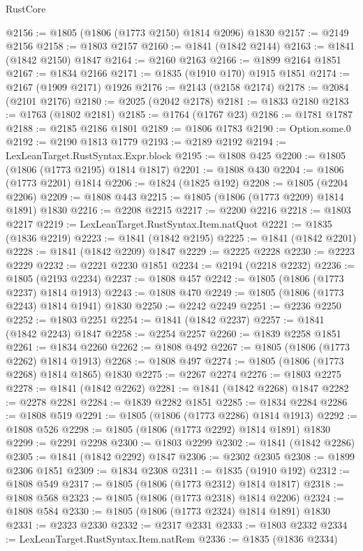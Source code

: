 \begin{lexlean}{RustCore}
\begin{coremodule}
@2156 := @1805 (@1806 (@1773 @2150) @1814 @2096) @1830
@2157 := @2149 @2156
@2158 := @1803 @2157
@2160 := @1841 (@1842 @2144)
@2163 := @1841 (@1842 @2150) @1847
@2164 := @2160 @2163
@2166 := @1899 @2164 @1851
@2167 := @1834 @2166
@2171 := @1835 (@1910 @170) @1915 @1851
@2174 := @2167 (@1909 @2171) @1926
@2176 := @2143 (@2158 @2174)
@2178 := @2084 (@2101 @2176)
@2180 := @2025 (@2042 @2178)
@2181 := @1833 @2180
@2183 := @1763 (@1802 @2181)
@2185 := @1764 (@1767 @23)
@2186 := @1781 @1787
@2188 := @2185 @2186 @1801
@2189 := @1806 @1783
@2190 := Option.some.{0}
@2192 := @2190 @1813 @1779
@2193 := @2189 @2192
@2194 := LexLeanTarget.RustSyntax.Expr.block
@2195 := @1808 @425
@2200 := @1805 (@1806 (@1773 @2195) @1814 @1817)
@2201 := @1808 @430
@2204 := @1806 (@1773 @2201) @1814
@2206 := @1824 (@1825 @192)
@2208 := @1805 (@2204 @2206)
@2209 := @1808 @443
@2215 := @1805 (@1806 (@1773 @2209) @1814 @1891) @1830
@2216 := @2208 @2215
@2217 := @2200 @2216
@2218 := @1803 @2217
@2219 := LexLeanTarget.RustSyntax.Item.natQuot
@2221 := @1835 (@1836 @2219)
@2223 := @1841 (@1842 @2195)
@2225 := @1841 (@1842 @2201)
@2228 := @1841 (@1842 @2209) @1847
@2229 := @2225 @2228
@2230 := @2223 @2229
@2232 := @2221 @2230 @1851
@2234 := @2194 (@2218 @2232)
@2236 := @1805 (@2193 @2234)
@2237 := @1808 @457
@2242 := @1805 (@1806 (@1773 @2237) @1814 @1913)
@2243 := @1808 @470
@2249 := @1805 (@1806 (@1773 @2243) @1814 @1941) @1830
@2250 := @2242 @2249
@2251 := @2236 @2250
@2252 := @1803 @2251
@2254 := @1841 (@1842 @2237)
@2257 := @1841 (@1842 @2243) @1847
@2258 := @2254 @2257
@2260 := @1839 @2258 @1851
@2261 := @1834 @2260
@2262 := @1808 @492
@2267 := @1805 (@1806 (@1773 @2262) @1814 @1913)
@2268 := @1808 @497
@2274 := @1805 (@1806 (@1773 @2268) @1814 @1865) @1830
@2275 := @2267 @2274
@2276 := @1803 @2275
@2278 := @1841 (@1842 @2262)
@2281 := @1841 (@1842 @2268) @1847
@2282 := @2278 @2281
@2284 := @1839 @2282 @1851
@2285 := @1834 @2284
@2286 := @1808 @519
@2291 := @1805 (@1806 (@1773 @2286) @1814 @1913)
@2292 := @1808 @526
@2298 := @1805 (@1806 (@1773 @2292) @1814 @1891) @1830
@2299 := @2291 @2298
@2300 := @1803 @2299
@2302 := @1841 (@1842 @2286)
@2305 := @1841 (@1842 @2292) @1847
@2306 := @2302 @2305
@2308 := @1899 @2306 @1851
@2309 := @1834 @2308
@2311 := @1835 (@1910 @192)
@2312 := @1808 @549
@2317 := @1805 (@1806 (@1773 @2312) @1814 @1817)
@2318 := @1808 @568
@2323 := @1805 (@1806 (@1773 @2318) @1814 @2206)
@2324 := @1808 @584
@2330 := @1805 (@1806 (@1773 @2324) @1814 @1891) @1830
@2331 := @2323 @2330
@2332 := @2317 @2331
@2333 := @1803 @2332
@2334 := LexLeanTarget.RustSyntax.Item.natRem
@2336 := @1835 (@1836 @2334)

\end{coremodule}
\end{lexlean}
